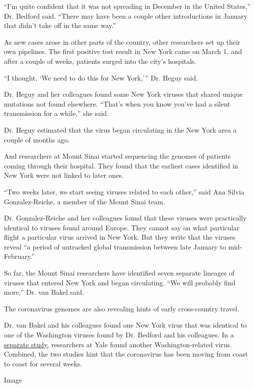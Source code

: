 ``I'm quite confident that it was not spreading in December in the
United States,'' Dr. Bedford said. ``There may have been a couple other
introductions in January that didn't take off in the same way.''

As new cases arose in other parts of the country, other researchers set
up their own pipelines. The first positive test result in New York came
on March 1, and after a couple of weeks, patients surged into the city's
hospitals.

``I thought, `We need to do this for New York,''' Dr. Heguy said.

Dr. Heguy and her colleagues found some New York viruses that shared
unique mutations not found elsewhere. ``That's when you know you've had
a silent transmission for a while,'' she said.

Dr. Heguy estimated that the virus began circulating in the New York
area a couple of months ago.

And researchers at Mount Sinai started sequencing the genomes of
patients coming through their hospital. They found that the earliest
cases identified in New York were not linked to later ones.

``Two weeks later, we start seeing viruses related to each other,'' said
Ana Silvia Gonzalez-Reiche, a member of the Mount Sinai team.

Dr. Gonzalez-Reiche and her colleagues found that these viruses were
practically identical to viruses found around Europe. They cannot say on
what particular flight a particular virus arrived in New York. But they
write that the viruses reveal ``a period of untracked global
transmission between late January to mid-February.''

So far, the Mount Sinai researchers have identified seven separate
lineages of viruses that entered New York and began circulating. ``We
will probably find more,'' Dr. van Bakel said.

The coronavirus genomes are also revealing hints of early cross-country
travel.

Dr. van Bakel and his colleagues found one New York virus that was
identical to one of the Washington viruses found by Dr. Bedford and his
colleagues. In a
\href{https://www.medrxiv.org/content/10.1101/2020.03.25.20043828v1}{separate
study,} researchers at Yale found another Washington-related virus.
Combined, the two studies hint that the coronavirus has been moving from
coast to coast for several weeks.

Image

